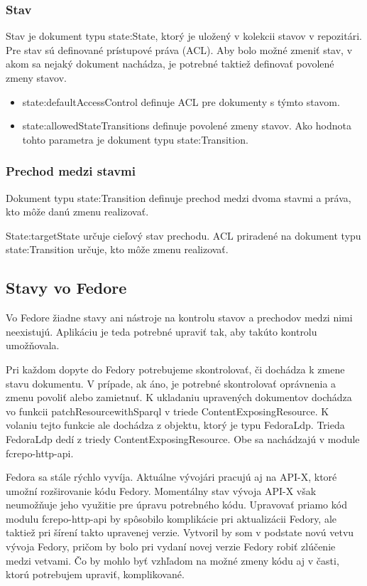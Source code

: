 \documentclass[thesis=M,slovak]{FITthesis}[2013/05/06]
\begin{document}
\subsubsection{Stav}
Stav je dokument typu state:State, ktorý je uložený v kolekcii stavov v repozitári. Pre stav sú definované prístupové práva (ACL). Aby bolo možné zmeniť stav, v akom sa nejaký dokument nachádza, je potrebné taktiež definovať povolené zmeny stavov.

\begin{itemize}
	\item state:defaultAccessControl definuje ACL pre dokumenty s týmto stavom.
	\item state:allowedStateTransitions definuje povolené zmeny stavov. Ako hodnota tohto parametra je dokument typu state:Transition.
\end{itemize}

\subsubsection{Prechod medzi stavmi}
Dokument typu state:Transition definuje prechod medzi dvoma stavmi a práva, kto môže danú zmenu realizovať.

State:targetState určuje cieľový stav prechodu.
ACL priradené na dokument typu state:Transition určuje, kto môže zmenu realizovať.

\subsection{Stavy vo Fedore}
Vo Fedore žiadne stavy ani nástroje na kontrolu stavov a prechodov medzi nimi neexistujú. Aplikáciu je teda potrebné upraviť tak, aby takúto kontrolu umožňovala.

Pri každom dopyte do Fedory potrebujeme skontrolovať, či dochádza k zmene stavu dokumentu. V prípade, ak áno, je potrebné skontrolovať oprávnenia a zmenu povoliť alebo zamietnuť. K ukladaniu upravených dokumentov dochádza vo funkcii patchResourcewithSparql v triede ContentExposingResource.
K volaniu tejto funkcie ale dochádza z objektu, ktorý je typu FedoraLdp. Trieda FedoraLdp dedí z triedy ContentExposingResource. Obe sa nachádzajú v module fcrepo-http-api.

Fedora sa stále rýchlo vyvíja. Aktuálne vývojári pracujú aj na API-X, ktoré umožní rozširovanie kódu Fedory. Momentálny stav vývoja API-X však neumožňuje jeho využitie pre úpravu potrebného kódu. Upravovať priamo kód modulu fcrepo-http-api by spôsobilo komplikácie pri aktualizácii Fedory, ale taktiež pri šírení takto upravenej verzie. Vytvoril by som v podstate novú vetvu vývoja Fedory, pričom by bolo pri vydaní novej verzie Fedory robiť zlúčenie medzi vetvami. Čo by mohlo byť vzhľadom na možné zmeny kódu aj v časti, ktorú potrebujem upraviť, komplikované.
\end{document}
